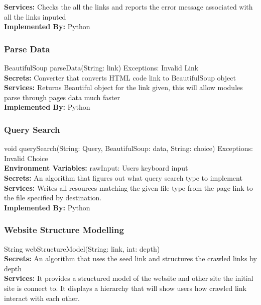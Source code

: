\documentclass[titlepage]{article}
\begin{document}
\textbf{Services:}
Checks the all the links and reports the error message associated with all the links inputed\\

\textbf{Implemented By:} Python

\subsubsection{Parse Data}
BeautifulSoup parseData(String: link) Exceptions: Invalid Link\\

\textbf{Secrets:}
Converter that converts HTML code link to BeautifulSoup object \\

\textbf{Services:}
Returns Beautiful object for the link given, this will allow modules parse through pages data much faster\\

\textbf{Implemented By:} Python

\subsubsection{Query Search}
void querySearch(String: Query, BeautifulSoup: data, String: choice) Exceptions: Invalid Choice\\

\textbf{Environment Variables:}
rawInput: Users keyboard input\\

\textbf{Secrets:}
An algorithm that figures out what query search type to implement \\

\textbf{Services:}
Writes all resources matching the given file type from the page link to the file specified by destination.\\

\textbf{Implemented By:}
Python

\subsubsection{Website Structure Modelling}
String webStructureModel(String: link, int: depth)\\

\textbf{Secrets:}
 An algorithm that uses the seed link and structures the crawled links by depth\\
 
\textbf{Services:}
It provides a structured model of the website and other site the initial site is connect to. It displays a hierarchy that will show users how crawled link interact with each other.\\
\end{document}
